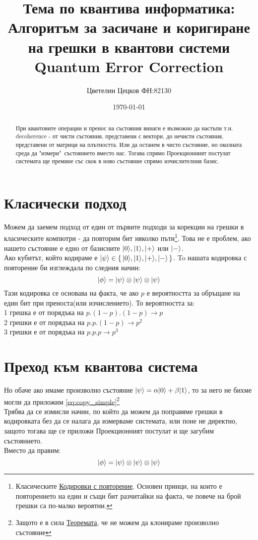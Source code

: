 \documentclass[11pt,oneside,a4paper]{article}
\title{Тема по квантива информатика: \\ Алгоритъм за засичане и коригиране на грешки в квантови системи\\ Quantum Error Correction}
\author{Цветелин Цецков ФН:82130 }
\date{\today}
\begin{document}
\maketitle
\tableofcontents
\newpage

\begin{abstract}
При квантовите операции и пренос на състояния винаги е възможно да настъпи т.н. decoherence - от чисти състояния, представени с вектори, до нечисти състояния, представени от матрици на плътността. Или да останем в чисто състояние, но околната среда да "измери"\ състоянието вместо нас. Тогава спрямо Проекционният постулат системата ще премине със скок в ново състояние спрямо изчислителния базис.
\end{abstract}

\section{Класически подход}
Можем да заемем подход от един от първите подходи за корекции на грешки в класическите компютри - да повторим бит няколко пъти\footnote{
Класическите \href{https://en.wikipedia.org/wiki/Repetition_code}{Кодировки с повторение}. Основен принци, на които е повторението на един и същи бит разчитайки на факта, че повече на брой грешки са по-малко вероятни.
}. Това не е проблем, ако нашето състояние е едно от базисните 
${\left\vert{0}\right\rangle}, {\left\vert{1}\right\rangle}, {\left\vert{+}\right\rangle}$ или ${\left\vert{-}\right\rangle}$.\\
Ако кубитът, който кодираме е ${\left\vert{\psi}\right\rangle}\in\set{{\left\vert{0}\right\rangle}, {\left\vert{1}\right\rangle}, {\left\vert{+}\right\rangle}, {\left\vert{-}\right\rangle}}$. To нашата кодировка с повторение би изглеждала по следния начин:
\begin{equation} \label{eq:copy_simple}
    {\left\vert{\phi}\right\rangle} = {\left\vert{\psi}\right\rangle} \otimes {\left\vert{\psi}\right\rangle} \otimes {\left\vert{\psi}\right\rangle}
\end{equation}
Тази кодировка се основава на факта, че ако $p$ е вероятността за обръщане на един бит при преноста(или изчислението). То вероятността за:\\
1 грешка е от порядъка на $p.(1-p).(1-p) \rightarrow p$ \\
2 грешки е от порядъка на $p.p.(1-p) \rightarrow p^2$ \\
3 грешки е от порядъка на $p.p.p \rightarrow p^3$

\section{Преход към квантова система}
Но обаче ако имаме произволно състояние ${\left\vert{\psi}\right\rangle} = \alpha{\left\vert{0}\right\rangle} + \beta{\left\vert{1}\right\rangle}$, то за него не бихме могли да приложим \eqref{eq:copy_simple}\footnote{
Защото е в сила \href{https://en.wikipedia.org/wiki/No-cloning_theorem}{Теоремата}, че не можем да клонираме произволно състояние 
}\\
Трябва да се измисли начин, по който да можем да поправяме грешки в кодировката без да се налага да измерваме системата, или поне не директно, защото тогава ще се приложи Проекционният постулат и ще загубим състоянието.\\
Вместо да правим:
\begin{equation} \label{eq:copy_simple_not_working}
    {\left\vert{\phi}\right\rangle} = {\left\vert{\psi}\right\rangle} \otimes {\left\vert{\psi}\right\rangle} \otimes {\left\vert{\psi}\right\rangle}
\end{equation}
\end{document}
